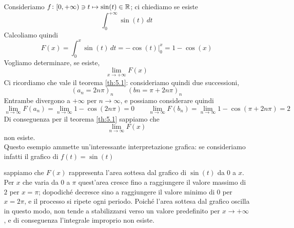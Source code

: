 \begin{example}
    Consideriamo $f\colon[0,+\infty)\ni t\mapsto  \sin(t)\in\amsbb{R}$; ci chiediamo se esiste
    \[
    \int_0^{+\infty}\sin(t)\, dt
    \]
    Calcoliamo quindi
    \[
    F(x) = \int_0^{x}\sin(t)\, dt = -\cos(t)\bigg|_0^x = 1-\cos(x)
    \]
    Vogliamo determinare, se esiste,
    \[
    \lim_{x\to+\infty}F(x)
    \]
    Ci ricordiamo che vale il teorema \ref{th:5.1}: consideriamo quindi due successioni,
    \[
    (a_n = 2n\pi)_n \qquad (bn=\pi + 2n\pi)_n
    \]
    Entrambe divergono a $+\infty$ per $n\to \infty$, e possiamo considerare quindi
    \[
    \lim_{n\to\infty} F(a_n) = \lim_{n\to\infty}1-\cos(2n\pi) = 0 \qquad \lim_{n\to\infty} F(b_n) = \lim_{n\to\infty} 1-\cos(\pi+2n\pi) = 2
    \]
    Di conseguenza per il teorema \ref{th:5.1} sappiamo che
    \[
    \lim_{n\to\infty}F(x)
    \]
    non esiste.\\
    Questo esempio ammette un'interessante interpretazione grafica: se consideriamo infatti il grafico di $f(t) = \sin(t)$
    \begin{center}
        \end{center}
        sappiamo che $F(x)$ rappresenta l'area sottesa dal grafico di $\sin(t)$ da $0$ a $x$. Per $x$ che varia da 0 a $\pi$ quest'area cresce fino a raggiungere il valore massimo di $2$ per $x=\pi$; dopodiché decresce sino a raggiungere il valore minimo di $0$ per $x=2\pi$, e il processo si ripete ogni periodo. Poiché l'area sottesa dal grafico oscilla in questo modo, non tende a stabilizzarsi verso un valore predefinito per $x\to +\infty$, e di conseguenza l'integrale improprio non esiste.
\end{example}
